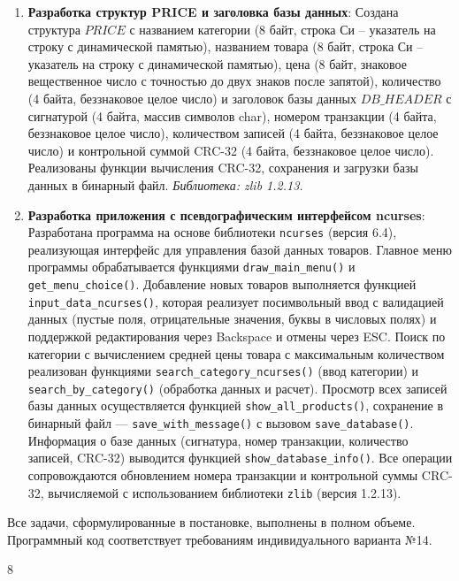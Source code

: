\documentclass[14pt]{extreport}
\begin{document}
{\begin{enumerate}
    \item \textbf{Разработка структур PRICE и заголовка базы данных}: 
    Создана структура $PRICE$ с названием категории (8 байт, строка Си -- указатель на строку с динамической памятью), названием товара (8 байт, строка Си -- указатель на строку с динамической памятью), цена (8 байт, знаковое вещественное число с точностью до двух знаков после запятой), количество (4 байта, беззнаковое целое число) и заголовок базы данных $DB\_HEADER$ с сигнатурой (4 байта, массив символов char), номером транзакции (4 байта, беззнаковое целое число), количеством записей (4 байта, беззнаковое целое число) и контрольной суммой CRC-32 (4 байта, беззнаковое целое число). Реализованы функции вычисления CRC-32, сохранения и загрузки базы данных в бинарный файл. \textit{Библиотека: zlib 1.2.13.}

    \item \textbf{Разработка приложения с псевдографическим интерфейсом ncurses}: 
    Разработана программа на основе библиотеки \texttt{ncurses} (версия 6.4), реализующая интерфейс для управления базой данных товаров. Главное меню программы обрабатывается функциями \texttt{draw\_main\_menu()} и \texttt{get\_menu\_choice()}. Добавление новых товаров выполняется функцией \texttt{input\_data\_ncurses()}, которая реализует посимвольный ввод с валидацией данных (пустые поля, отрицательные значения, буквы в числовых полях) и поддержкой редактирования через Backspace и отмены через ESC. Поиск по категории с вычислением средней цены товара с максимальным количеством реализован функциями \texttt{search\_category\_ncurses()} (ввод категории) и \texttt{search\_by\_category()} (обработка данных и расчет). Просмотр всех записей базы данных осуществляется функцией \texttt{show\_all\_products()}, сохранение в бинарный файл — \texttt{save\_with\_message()} с вызовом \texttt{save\_database()}. Информация о базе данных (сигнатура, номер транзакции, количество записей, CRC-32) выводится функцией \texttt{show\_database\_info()}. Все операции сопровождаются обновлением номера транзакции и контрольной суммы CRC-32, вычисляемой с использованием библиотеки \texttt{zlib} (версия 1.2.13). 

\end{enumerate}

Все задачи, сформулированные в постановке, выполнены в полном объеме. Программный код соответствует требованиям индивидуального варианта №14.
\newpage
\renewcommand{\bibname}{\vspace{-3.2cm}\centering\LargeСписок используемых источников}
\begin{thebibliography}{8}


\end{thebibliography}}
\end{document}
